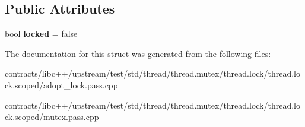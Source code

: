 \subsection*{Public Attributes}
\begin{DoxyCompactItemize}
\item 
\mbox{\label{struct_test_mutex_a793621a4a1f394b884bf71a15515bf64}} 
bool {\bfseries locked} = false
\end{DoxyCompactItemize}


The documentation for this struct was generated from the following files\+:\begin{DoxyCompactItemize}
\item 
contracts/libc++/upstream/test/std/thread/thread.\+mutex/thread.\+lock/thread.\+lock.\+scoped/adopt\+\_\+lock.\+pass.\+cpp\item 
contracts/libc++/upstream/test/std/thread/thread.\+mutex/thread.\+lock/thread.\+lock.\+scoped/mutex.\+pass.\+cpp\end{DoxyCompactItemize}
